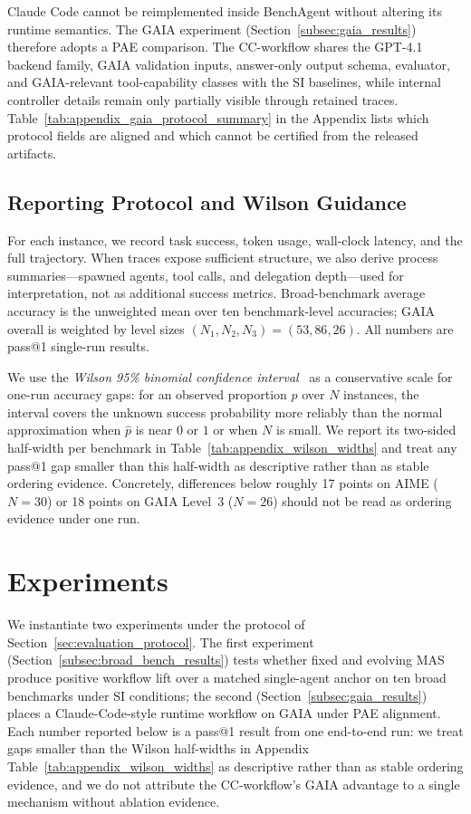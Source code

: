 Claude Code cannot be reimplemented inside BenchAgent without altering its runtime semantics.
The GAIA experiment (Section~\ref{subsec:gaia_results}) therefore adopts a PAE comparison.
The CC-workflow shares the GPT-4.1 backend family, GAIA validation inputs, answer-only output schema, evaluator, and GAIA-relevant tool-capability classes with the SI baselines, while internal controller details remain only partially visible through retained traces.
Table~\ref{tab:appendix_gaia_protocol_summary} in the Appendix lists which protocol fields are aligned and which cannot be certified from the released artifacts.

\subsection{Reporting Protocol and Wilson Guidance}
\label{subsec:pass1_wilson}
For each instance, we record task success, token usage, wall-clock latency, and the full trajectory.
When traces expose sufficient structure, we also derive process summaries---spawned agents, tool calls, and delegation depth---used for interpretation, not as additional success metrics.
Broad-benchmark average accuracy is the unweighted mean over ten benchmark-level accuracies; GAIA overall is weighted by level sizes $(N_1,N_2,N_3)=(53,86,26)$.
All numbers are pass@1 single-run results.

We use the \emph{Wilson 95\% binomial confidence interval}~\citep{wilson1927} as a conservative scale for one-run accuracy gaps: for an observed proportion $\hat{p}$ over $N$ instances, the interval covers the unknown success probability more reliably than the normal approximation when $\hat{p}$ is near $0$ or $1$ or when $N$ is small.
We report its two-sided half-width per benchmark in Table~\ref{tab:appendix_wilson_widths} and treat any pass@1 gap smaller than this half-width as descriptive rather than as stable ordering evidence.
Concretely, differences below roughly 17 points on AIME ($N{=}30$) or 18 points on GAIA Level~3 ($N{=}26$) should not be read as ordering evidence under one run.

\section{Experiments}
\label{sec:experiments}
We instantiate two experiments under the protocol of Section~\ref{sec:evaluation_protocol}.
The first experiment (Section~\ref{subsec:broad_bench_results}) tests whether fixed and evolving MAS produce positive workflow lift over a matched single-agent anchor on ten broad benchmarks under SI conditions; the second (Section~\ref{subsec:gaia_results}) places a Claude-Code-style runtime workflow on GAIA under PAE alignment.
Each number reported below is a pass@1 result from one end-to-end run: we treat gaps smaller than the Wilson half-widths in Appendix Table~\ref{tab:appendix_wilson_widths} as descriptive rather than as stable ordering evidence, and we do not attribute the CC-workflow's GAIA advantage to a single mechanism without ablation evidence.

